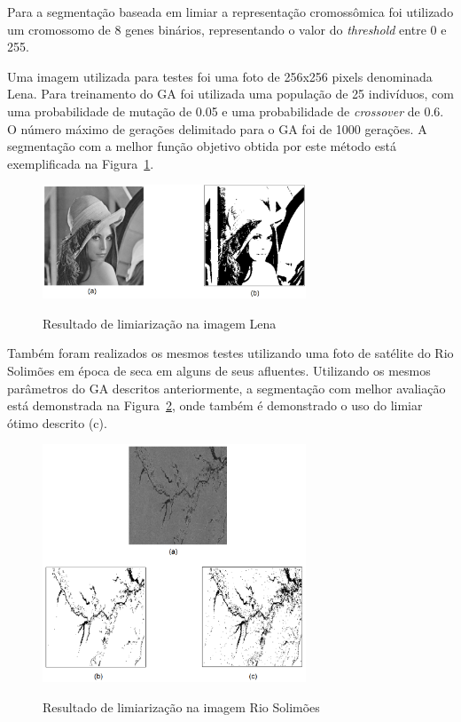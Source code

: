 \documentclass[12pt,oneside,a4paper,english,french,spanish,brazil,]{abntex2}
\begin{document}
Para a segmentação baseada em limiar a representação cromossômica foi utilizado um cromossomo de 8 genes binários, representando o valor do \textit{threshold} entre 0 e 255. 

Uma imagem utilizada para testes foi uma foto de 256x256 pixels denominada Lena. Para treinamento do GA foi utilizada uma população de 25 indivíduos, com uma probabilidade de mutação de 0.05 e uma probabilidade de \textit{crossover} de 0.6. O número máximo de gerações delimitado para o GA foi de 1000 gerações. A segmentação com a melhor função objetivo obtida por este método está exemplificada na Figura~\ref{fig:TrCo_Matias_Limiar_1}.

\begin{figure}[ht]
\centering
\caption{Resultado de limiarização na imagem Lena}
\includegraphics[width=0.7\textwidth]{imagens/TrCo_Matias_Limiar_1.PNG}
\label{fig:TrCo_Matias_Limiar_1}
\end{figure}

Também foram realizados os mesmos testes utilizando uma foto de satélite do Rio Solimões em época de seca em alguns de seus afluentes. Utilizando os mesmos parâmetros do GA descritos anteriormente, a segmentação com melhor avaliação está demonstrada na Figura~\ref{fig:TrCo_Matias_Limiar_2}, onde também é demonstrado o uso do limiar ótimo descrito \cite{gonzalez:2012} (c).

\begin{figure}[ht]
\centering
\caption{Resultado de limiarização na imagem Rio Solimões}
\includegraphics[width=0.7\textwidth]{imagens/TrCo_Matias_Limiar_2.PNG}
\label{fig:TrCo_Matias_Limiar_2}
\end{figure}
\end{document}
